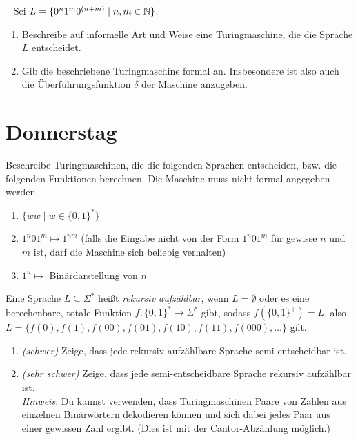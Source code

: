 \documentclass{uebung_cs}
\begin{document}
\begin{exercise}\
	Sei $L = \{0^n 1^m 0^{(n+m)} \;|\; n,m \in \mathbb{N}\}$.
	\begin{enumerate}
		\item Beschreibe auf informelle Art und Weise eine Turingmaschine, die die Sprache $L$ entscheidet.
		\item Gib die beschriebene Turingmaschine formal an. Insbesondere ist also auch die Überführungsfunktion $\delta$ der Maschine anzugeben.		
	\end{enumerate}
\end{exercise}

\section*{Donnerstag}

\begin{exercise}[Turingmaschinen IV]
	Beschreibe Turingmaschinen, die die folgenden Sprachen entscheiden, bzw. die folgenden Funktionen berechnen. Die Maschine muss nicht formal angegeben werden.
	\begin{enumerate}
		\item $\{ww \;|\; w \in \{0,1\}^*\}$
		\item $1^n 0 1^m \mapsto 1^{nm}$ (falls die Eingabe nicht von der Form $1^n 0 1^m$ für gewisse $n$ und $m$ ist, darf die Maschine sich beliebig verhalten)
		\item $1^n \mapsto$ Binärdarstellung von $n$
	\end{enumerate}
\end{exercise}

\begin{exercise}
	Eine Sprache $L \subseteq \Sigma^*$ heißt \emph{rekursiv aufzählbar}, wenn $L = \emptyset$ oder es eine berechenbare, totale Funktion $f \colon \{0,1\}^* \rightarrow \Sigma^*$ gibt, sodass $f(\{0,1\}^+) = L$, also $L = \{f(0), f(1), f(00), f(01), f(10), f(11), f(000), \dots\}$ gilt.
	\begin{enumerate}
		\item \emph{(schwer)} Zeige, dass jede rekursiv aufzählbare Sprache semi-entscheidbar ist.
		\item \emph{(sehr schwer)} Zeige, dass jede semi-entscheidbare Sprache rekursiv aufzählbar ist.\\
    \emph{Hinweis}: Du kannst verwenden, dass Turingmaschinen Paare von Zahlen aus einzelnen Binärwörtern dekodieren können und sich dabei jedes Paar aus einer gewissen Zahl ergibt.
    (Dies ist mit der Cantor-Abzählung möglich.)
	\end{enumerate}
\end{exercise}
\end{document}
